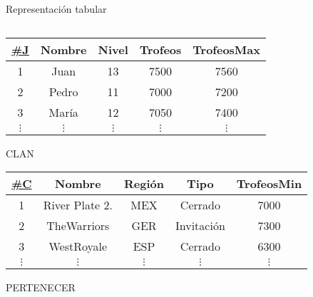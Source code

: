 \begin{frame}{Representaci\'on tabular}
\begin{columns}[T]
\begin{column}{0.48\linewidth}
\begin{center}
\begin{tiny}
                    \begin{tabular}{|c|c|c|c|c|}
                        \hline
                        \underline{\#J} & Nombre & Nivel& Trofeos & TrofeosMax\\
                        \hline
                        1 & Juan & 13 & 7500 & 7560\\
                        \hline
                        2 & Pedro &  11 & 7000 & 7200 \\
                        \hline
                        3 & Mar\'ia & 12  & 7050 & 7400\\
                        \hline
                        $\vdots$ & $\vdots$ & $\vdots$ & $\vdots$ & $\vdots$\\
                        \hline
                        
                    \end{tabular}
                \end{tiny}
                
                \vspace{3mm}

                \tiny{CLAN}
                \vspace{2mm}

                \begin{tiny}
                    \begin{tabular}{|c|c|c|c|c|}
                        \hline
                        \underline{\#C} & Nombre & Regi\'on & Tipo & TrofeosMin\\
                        \hline
                        1 & River Plate 2. & MEX & Cerrado & 7000 \\
                        \hline
                        2 & TheWarriors & GER & Invitaci\'on & 7300\\
                        \hline
                        3 & WestRoyale &  ESP & Cerrado & 6300\\
                        \hline
                        $\vdots$ & $\vdots$ & $\vdots$ & $\vdots$ & $\vdots$\\
                        \hline
                        
                    \end{tabular}
                \end{tiny}
                
                \vspace{3mm}

                \tiny{PERTENECER}
                \vspace{2mm}


\end{center}
\end{column}
\end{columns}
\end{frame}
